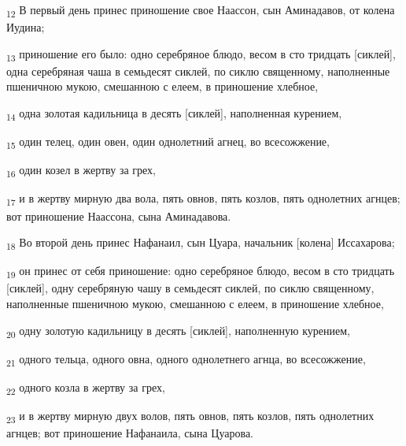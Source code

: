 \begin{tcolorbox}
\textsubscript{12} В первый день принес приношение свое Наассон, сын Аминадавов, от колена Иудина;
\end{tcolorbox}
\begin{tcolorbox}
\textsubscript{13} приношение его было: одно серебряное блюдо, весом в сто тридцать [сиклей], одна серебряная чаша в семьдесят сиклей, по сиклю священному, наполненные пшеничною мукою, смешанною с елеем, в приношение хлебное,
\end{tcolorbox}
\begin{tcolorbox}
\textsubscript{14} одна золотая кадильница в десять [сиклей], наполненная курением,
\end{tcolorbox}
\begin{tcolorbox}
\textsubscript{15} один телец, один овен, один однолетний агнец, во всесожжение,
\end{tcolorbox}
\begin{tcolorbox}
\textsubscript{16} один козел в жертву за грех,
\end{tcolorbox}
\begin{tcolorbox}
\textsubscript{17} и в жертву мирную два вола, пять овнов, пять козлов, пять однолетних агнцев; вот приношение Наассона, сына Аминадавова.
\end{tcolorbox}
\begin{tcolorbox}
\textsubscript{18} Во второй день принес Нафанаил, сын Цуара, начальник [колена] Иссахарова;
\end{tcolorbox}
\begin{tcolorbox}
\textsubscript{19} он принес от себя приношение: одно серебряное блюдо, весом в сто тридцать [сиклей], одну серебряную чашу в семьдесят сиклей, по сиклю священному, наполненные пшеничною мукою, смешанною с елеем, в приношение хлебное,
\end{tcolorbox}
\begin{tcolorbox}
\textsubscript{20} одну золотую кадильницу в десять [сиклей], наполненную курением,
\end{tcolorbox}
\begin{tcolorbox}
\textsubscript{21} одного тельца, одного овна, одного однолетнего агнца, во всесожжение,
\end{tcolorbox}
\begin{tcolorbox}
\textsubscript{22} одного козла в жертву за грех,
\end{tcolorbox}
\begin{tcolorbox}
\textsubscript{23} и в жертву мирную двух волов, пять овнов, пять козлов, пять однолетних агнцев; вот приношение Нафанаила, сына Цуарова.
\end{tcolorbox}
